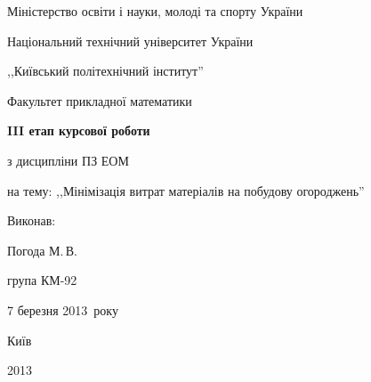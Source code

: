 \documentclass[a4paper,12pt,notitlepage,pdftex]{scrartcl}
\begin{document}
\begin{titlepage}
    \Large
    \begin{center}
        Міністерство освіти і науки, молоді та спорту України

        Національний технічний університет України

        ,,Київський політехнічний інститут''

        \vspace*{1cm}

        Факультет прикладної математики

        \vspace*{3.5cm}

        \textbf{III етап курсової роботи}

        з дисципліни ПЗ ЕОМ

        на тему: ,,Мінімізація витрат матеріалів на побудову огороджень''
    \end{center}

    \vspace*{4cm}

    Виконав:\hfill
        \begin{minipage}{0.3\textwidth}
            Погода М.\,В.

            група КМ-92
        \end{minipage}

    \vspace*{1cm}

    \hfill 7 березня 2013~року

    \vfill

    \begin{center}
        \Large
        Київ

        2013
    \end{center}
\end{titlepage}
\end{document}
